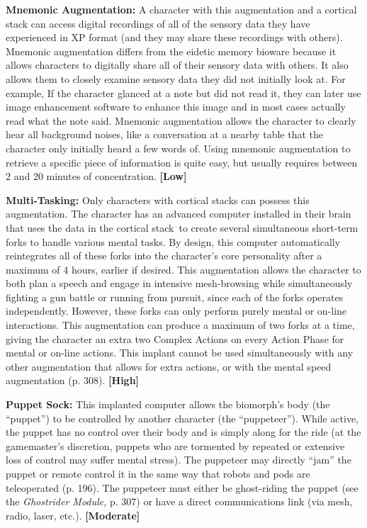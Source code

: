 \textbf{Mnemonic Augmentation:} A character with this 
augmentation and a cortical stack can access digital 
recordings of all of the sensory data they have experienced
in XP format (and they may share these
recordings with others). Mnemonic augmentation 
differs from the eidetic memory bioware because it 
allows characters to digitally share all of their sensory 
data with others. It also allows them to closely examine
sensory data they did not initially look at. For
example, If the character glanced at a note but did not 
read it, they can later use image enhancement software
to enhance this image and in most cases actually
read what the note said. Mnemonic augmentation 
allows the character to clearly hear all background 
noises, like a conversation at a nearby table that the 
character only initially heard a few words of. Using 
mnemonic augmentation to retrieve a specific piece of 
information is quite easy, but usually requires between 
2 and 20 minutes of concentration. \textbf{[Low]}

\textbf{Multi-Tasking:} Only characters with cortical stacks 
can possess this augmentation. The character has an 
advanced computer installed in their brain that uses 
the data in the cortical stack to create several simultaneous
short-term forks to handle various mental tasks.
By design, this computer automatically reintegrates 
all of these forks into the character's core personality 
after a maximum of 4 hours, earlier if desired. This 
augmentation allows the character to both plan a 
speech and engage in intensive mesh-browsing while 
simultaneously fighting a gun battle or running from 
pursuit, since each of the forks operates independently. 
However, these forks can only perform purely mental 
or on-line interactions. This augmentation can produce
a maximum of two forks at a time, giving the
character an extra two Complex Actions on every 
Action Phase for mental or on-line actions. This implant
cannot be used simultaneously with any other
augmentation that allows for extra actions, or with 
the mental speed augmentation (p. 308). \textbf{[High]}

\textbf{Puppet Sock:} This implanted computer allows the 
biomorph's body (the ``puppet'') to be controlled by 
another character (the ``puppeteer''). While active, the 
puppet has no control over their body and is simply 
along for the ride (at the gamemaster's discretion, 
puppets who are tormented by repeated or extensive
loss of control may suffer mental stress). The
puppeteer may directly ``jam'' the puppet or remote 
control it in the same way that robots and pods are 
teleoperated (p. 196). The puppeteer must either be 
ghost-riding the puppet (see the \textit{Ghostrider Module,} p. 
307) or have a direct communications link (via mesh, 
radio, laser, etc.). \textbf{[Moderate]}

